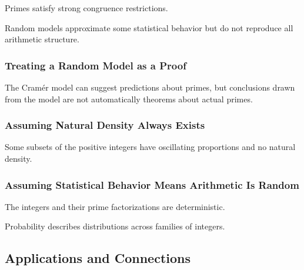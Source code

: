 Primes satisfy strong congruence restrictions.

Random models approximate some statistical behavior but do not reproduce all
arithmetic structure.

\subsubsection{Treating a Random Model as a Proof}

The Cramér model can suggest predictions about primes, but conclusions drawn
from the model are not automatically theorems about actual primes.

\subsubsection{Assuming Natural Density Always Exists}

Some subsets of the positive integers have oscillating proportions and no
natural density.

\subsubsection{Assuming Statistical Behavior Means Arithmetic Is Random}

The integers and their prime factorizations are deterministic.

Probability describes distributions across families of integers.

\subsection{Applications and Connections}
\label{subsec:probabilistic-number-theory-applications}

